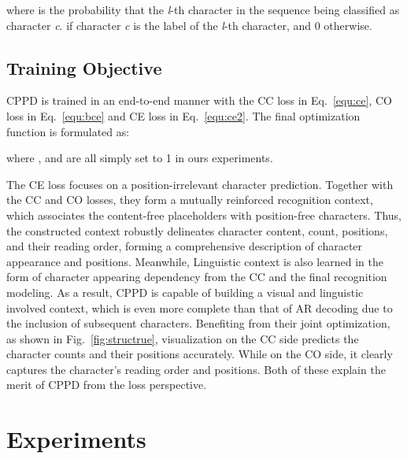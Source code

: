 \documentclass[10pt,journal,compsoc]{IEEEtran}
\begin{document}
\noindent where  is the probability that the \emph{l}-th character in the sequence being classified as character \emph{c}.  if character \emph{c} is the label of the \emph{l}-th character, and 0 otherwise. 



\subsection{Training Objective}

CPPD is trained in an end-to-end manner with the CC loss in Eq.~\ref{equ:ce}, CO loss in Eq.~\ref{equ:bce} and CE loss in Eq.~\ref{equ:ce2}. The final optimization function is formulated as:



\noindent where ,  and  are all simply set to 1 in ours experiments. 

The CE loss focuses on a position-irrelevant character prediction. Together with the CC and CO losses, they form a mutually reinforced recognition context, which associates the content-free placeholders with position-free characters. Thus, the constructed context robustly delineates character content, count, positions, and their reading order, forming a comprehensive description of character appearance and positions. Meanwhile, Linguistic context is also learned in the form of character appearing dependency from the CC and the final recognition modeling. As a result, CPPD is capable of building a visual and linguistic involved context, which is even more complete than that of AR decoding due to the inclusion of subsequent characters. Benefiting from their joint optimization, as shown in Fig.~\ref{fig:structrue}, visualization on the CC side predicts the character counts and their positions accurately. While on the CO side, it clearly captures the character's reading order and positions. Both of these explain the merit of CPPD from the loss perspective. 

\section{Experiments}
\end{document}
